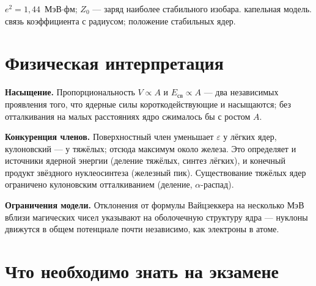  {$e^2=1{,}44$~МэВ$\cdot$фм; $Z_0$ — заряд наиболее стабильного изобара.}
 {капельная модель.}
 {связь коэффициента с радиусом; положение стабильных ядер.}

\section{Физическая интерпретация}

\textbf{Насыщение.} Пропорциональность $V\propto A$ и $E_{\text{св}}\propto A$ — два независимых проявления того, что ядерные силы
короткодействующие и насыщаются; без отталкивания на малых расстояниях ядро сжималось бы с ростом $A$.

\textbf{Конкуренция членов.} Поверхностный член уменьшает $\varepsilon$ у лёгких ядер, кулоновский — у тяжёлых; отсюда максимум
около железа. Это определяет и источники ядерной энергии (деление тяжёлых, синтез лёгких), и конечный продукт
звёздного нуклеосинтеза (железный пик). Существование тяжёлых ядер ограничено кулоновским отталкиванием (деление,
$\alpha$-распад).

\textbf{Ограничения модели.} Отклонения от формулы Вайцзеккера на несколько МэВ вблизи магических чисел указывают на
оболочечную структуру ядра — нуклоны движутся в общем потенциале почти независимо, как электроны в атоме.

\section{Что необходимо знать на экзамене}

